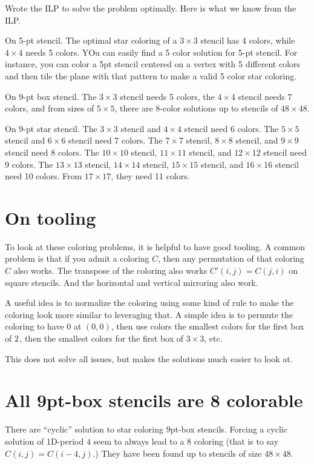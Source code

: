 \documentclass{article}
\begin{document}
Wrote the ILP to solve the problem optimally. Here is what we know
from the ILP.

On 5-pt stencil. The optimal star coloring of a $3 \times 3$ stencil
has 4 colors, while $4 \times 4$ needs 5 colors. YOu can easily find a
5 color solution for 5-pt stencil. For instance, you can color a 5pt stencil
centered on a vertex with 5 different colors and then tile the plane
with that pattern to make a valid 5 color star coloring.

On 9-pt box stencil. The $3 \times 3$ stencil needs 5 colors, the $4
\times 4$ stencil needs 7 colors, and from sizes of $5 \times 5$,
there are 8-color solutions up to stencils of $48 \times 48$.

On 9-pt star stencil. The $3 \times 3$ stencil and $4 \times 4$
stencil need 6 colors. The $5 \times 5$ stencil and $6 \times 6$
stencil need 7 colors. The $7 \times 7$ stencil, $8 \times 8$ stencil,
and $9 \times 9$ stencil need 8 colors. The $10 \times 10$ stencil,
$11 \times 11$ stencil, and $12 \times 12$ stencil need 9 colors. The
$13 \times 13$ stencil, $14 \times 14$ stencil, $15 \times 15$
stencil, and $16 \times 16$ stencil need 10 colors. From $17 \times 17$, they need 11 colors.

\section{On tooling}

To look at these coloring problems, it is helpful to have good
tooling. A common problem is that if you admit a coloring $C$, then
any permutation of that coloring $C$ also works. The transpose of the
coloring also works $C'(i,j) = C(j,i)$ on square stencils. And the
horizontal and vertical mirroring also work.

A useful idea is to normalize the coloring using some kind of rule to
make the coloring look more similar to leveraging that. A simple idea
is to permute the coloring to have 0 at $(0,0)$, then use colors the
smallest colors for the first box of $2\time 2$, then the smallest
colors for the first box of $3 \times 3$, etc.

This does not solve all issues, but makes the solutions much easier to
look at.

\section{All 9pt-box stencils are 8 colorable}

There are ``cyclic'' solution to star coloring 9pt-box
stencils. Forcing a cyclic solution of 1D-period $4$ seem to always
lead to a 8 coloring (that is to say $C(i,j) = C(i-4,j)$.) They have
been found up to stencils of size $48 \times 48$.
\end{document}
